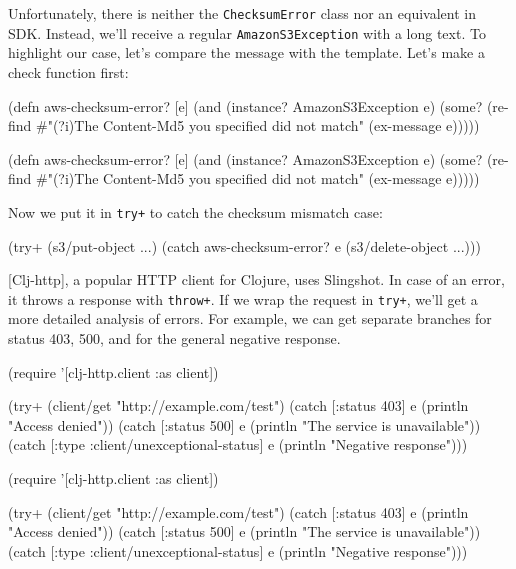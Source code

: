 Unfortunately, there is neither the \verb|ChecksumError| class nor an equivalent in SDK. Instead, we'll receive a regular \verb|AmazonS3Exception| with a long text. To highlight our case, let's compare the message with the template. Let's make a check function first:

\ifnarrow

\begin{clojure}
(defn aws-checksum-error? [e]
  (and
    (instance? AmazonS3Exception e)
    (some?
      (re-find
        #"(?i)The Content-Md5
            you specified did not match"
        (ex-message e)))))
\end{clojure}

\else

\begin{clojure}
(defn aws-checksum-error? [e]
  (and (instance? AmazonS3Exception e)
       (some?
        (re-find
         #"(?i)The Content-Md5 you specified did not match"
         (ex-message e)))))
\end{clojure}

\fi

Now we put it in \verb|try+| to catch the checksum mismatch case:

\begin{clojure}
(try+
  (s3/put-object ...)
  (catch aws-checksum-error? e
    (s3/delete-object ...)))
\end{clojure}

[Clj-http], a popular HTTP client for Clojure, uses Slingshot. In case of an error, it throws a response with \verb|throw+|. If we wrap the request in \verb|try+|, we'll get a more detailed analysis of errors. For example, we can get separate branches for status 403, 500, and for the general negative response.

\ifnarrow

\begin{english}
  \begin{clojure}
(require '[clj-http.client :as client])

(try+
 (client/get "http://example.com/test")
 (catch [:status 403] e
  (println "Access denied"))
 (catch [:status 500] e
  (println "The service is unavailable"))
 (catch
  [:type :client/unexceptional-status] e
  (println "Negative response")))
  \end{clojure}
\end{english}

\else

\begin{english}
  \begin{clojure}
(require '[clj-http.client :as client])

(try+
 (client/get "http://example.com/test")
 (catch [:status 403] e
  (println "Access denied"))
 (catch [:status 500] e
   (println "The service is unavailable"))
 (catch [:type :client/unexceptional-status] e
   (println "Negative response")))
  \end{clojure}
\end{english}

